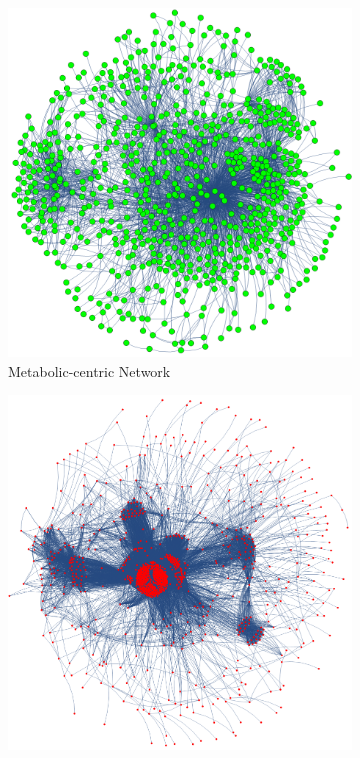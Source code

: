 \begin{figure}[!ht]
	\centering
	\begin{subfigure}{0.5\textwidth}
		\includegraphics[width=1\linewidth]{../images/methodology-ORmodel-metabolic_centric_network.png}
		\caption{Metabolic-centric Network}
		\label{figure-metabolic-centric}
	\end{subfigure}\hfill%
	\begin{subfigure}{0.5\textwidth}
		\includegraphics[width=1\linewidth]{../images/methodology-ORmodel-reaction_centric_network.png}

\end{subfigure}
\end{figure}

